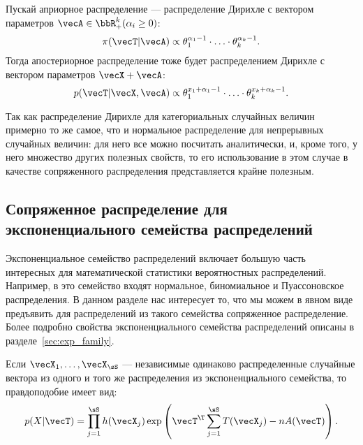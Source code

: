 Пускай априорное распределение --- распределение Дирихле с вектором параметров $\vecA \in \bbR_+^k (\alpha_i \geq 0)$:
\[
\pi(\vecT | \vecA) \propto \theta_1^{\alpha_1 - 1} \cdot \ldots \cdot \theta_k^{\alpha_k - 1}.
\]
Тогда апостериорное распределение тоже будет распределением Дирихле с вектором параметров $\vecX + \vecA$:
\[
p(\vecT | \vecX, \vecA) \propto \theta_1^{x_1 + \alpha_1 - 1} \cdot \ldots \cdot \theta_k^{x_k + \alpha_k - 1}.
\]

Так как распределение Дирихле для категориальных случайных величин примерно то же самое, что и нормальное распределение для непрерывных случайных величин: для него все можно посчитать аналитически, и, кроме того, у него множество других полезных свойств, то его использование в этом случае в 
качестве сопряженного распределения представляется крайне полезным.



\subsection{Сопряженное распределение для экспоненциального семейства распределений}

Экспоненциальное семейство распределений включает большую часть интересных для математической статистики вероятностных распределений.
Например, в это семейство входят нормальное, биномиальное и Пуассоновское распределения.
В данном разделе нас интересует то, что мы можем в явном виде предъявить для распределений из такого семейства сопряженное распределение.
Более подробно свойства экспоненциального семейства распределений описаны в разделе~\ref{sec:exp_family}.

Если $\vecX_1, \ldots, \vecX_\sS$ --- независимые одинаково распределенные случайные вектора из одного и того же распределения из экспоненциального семейства, то правдоподобие имеет вид:
\begin{equation}
\label{eq:exp_likelihood}
p(X | \vecT) = \prod_{j = 1}^{\sS} h(\vecX_j) \exp \left(\vecT^\T \sum_{j = 1}^\sS T(\vecX_j) - n A(\vecT) \right).
\end{equation}

